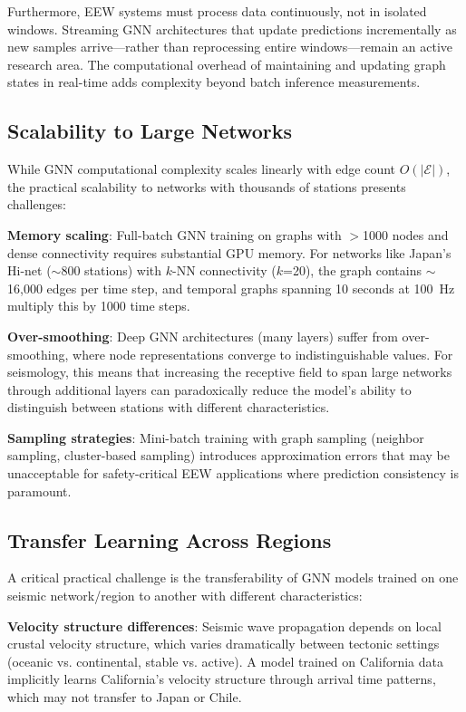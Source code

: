 \documentclass[review,authoryear]{elsarticle}
\begin{document}
Furthermore, EEW systems must process data continuously, not in isolated windows. Streaming GNN architectures that update predictions incrementally as new samples arrive---rather than reprocessing entire windows---remain an active research area. The computational overhead of maintaining and updating graph states in real-time adds complexity beyond batch inference measurements.

\subsection{Scalability to Large Networks}

While GNN computational complexity scales linearly with edge count $O(|\mathcal{E}|)$, the practical scalability to networks with thousands of stations presents challenges:

\textbf{Memory scaling}: Full-batch GNN training on graphs with $>$1000 nodes and dense connectivity requires substantial GPU memory. For networks like Japan's Hi-net ($\sim$800 stations) with $k$-NN connectivity ($k$=20), the graph contains $\sim$16,000 edges per time step, and temporal graphs spanning 10 seconds at 100~Hz multiply this by 1000 time steps.

\textbf{Over-smoothing}: Deep GNN architectures (many layers) suffer from over-smoothing, where node representations converge to indistinguishable values. For seismology, this means that increasing the receptive field to span large networks through additional layers can paradoxically reduce the model's ability to distinguish between stations with different characteristics.

\textbf{Sampling strategies}: Mini-batch training with graph sampling (neighbor sampling, cluster-based sampling) introduces approximation errors that may be unacceptable for safety-critical EEW applications where prediction consistency is paramount.

\subsection{Transfer Learning Across Regions}

A critical practical challenge is the transferability of GNN models trained on one seismic network/region to another with different characteristics:

\textbf{Velocity structure differences}: Seismic wave propagation depends on local crustal velocity structure, which varies dramatically between tectonic settings (oceanic vs. continental, stable vs. active). A model trained on California data implicitly learns California's velocity structure through arrival time patterns, which may not transfer to Japan or Chile.
\end{document}
